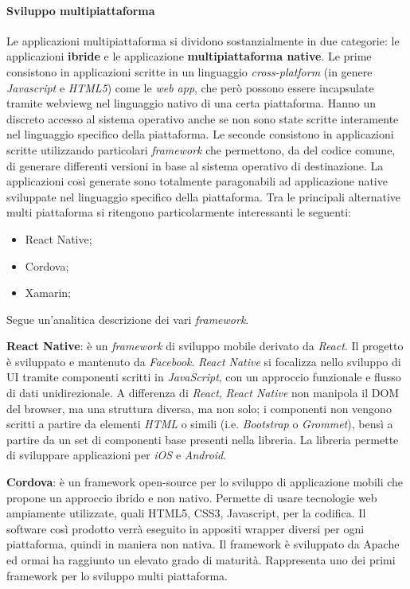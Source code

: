 \paragraph{Sviluppo multipiattaforma}
Le applicazioni multipiattaforma si dividono sostanzialmente in due categorie: le applicazioni \textbf{ibride} e le applicazione \textbf{multipiattaforma native}.
\medskip
Le prime consistono in applicazioni scritte in un linguaggio \emph{cross-platform} (in genere \emph{Javascript} e \emph{HTML5}) come le \emph{web app}, che però possono essere incapsulate tramite \gls{webviewg} nel linguaggio nativo di una certa piattaforma. Hanno un discreto accesso al sistema operativo anche se non sono state scritte interamente nel linguaggio specifico della piattaforma.
\medskip
Le seconde consistono in applicazioni scritte utilizzando particolari \emph{framework} che permettono, da del codice comune, di generare differenti versioni in base al sistema operativo di destinazione. La applicazioni così generate sono totalmente paragonabili ad applicazione native sviluppate nel linguaggio specifico della piattaforma. 
\medskip
Tra le principali alternative multi piattaforma si ritengono particolarmente interessanti le seguenti:
\begin{itemize}
    \item React Native;
    \item Cordova;
    \item Xamarin;
\end{itemize}
Segue un’analitica descrizione dei vari \emph{framework}.

\textbf{React Native}: è un \emph{framework} di sviluppo mobile derivato da \emph{React}. Il progetto è sviluppato e mantenuto da \emph{Facebook}. \emph{React Native} si focalizza nello sviluppo di UI tramite componenti scritti in \emph{JavaScript}, con un approccio funzionale e flusso di dati unidirezionale.  A differenza di \emph{React}, \emph{React Native} non manipola il DOM del browser, ma una struttura diversa, ma non solo; i componenti non vengono scritti a partire da elementi \emph{HTML} o simili (i.e. \emph{Bootstrap} o \emph{Grommet}),  bensì a partire da un set di componenti base presenti nella libreria. La libreria permette di sviluppare applicazioni per \emph{iOS} e \emph{Android}.

\textbf{Cordova}: è un framework open-source per lo sviluppo di applicazione mobili che propone un approccio ibrido e non nativo. Permette di usare tecnologie web ampiamente utilizzate, quali HTML5, CSS3, Javascript, per la codifica. Il software così prodotto verrà eseguito in appositi wrapper diversi per ogni piattaforma, quindi in maniera non nativa. Il framework è sviluppato da Apache ed ormai ha raggiunto un elevato grado di maturità. Rappresenta uno dei primi framework per lo sviluppo multi piattaforma.

